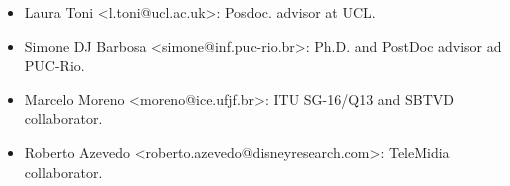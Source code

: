 \begin{itemize}[nosep]
  \item Laura Toni <l.toni@ucl.ac.uk>: Posdoc. advisor at UCL.
  
  
  \item Simone DJ Barbosa <simone@inf.puc-rio.br>: Ph.D. and PostDoc advisor ad PUC-Rio.
  
  \item Marcelo Moreno <moreno@ice.ufjf.br>: ITU SG-16/Q13 and SBTVD collaborator. 
  
  \item Roberto Azevedo <roberto.azevedo@disneyresearch.com>: TeleMidia collaborator. 
  
  
  
\end{itemize}
